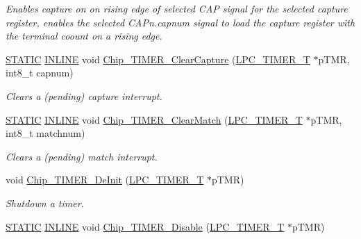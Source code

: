 \begin{DoxyCompactItemize}
\begin{DoxyCompactList}\small\item\em Enables capture on on rising edge of selected C\+AP signal for the selected capture register, enables the selected C\+A\+Pn.\+capnum signal to load the capture register with the terminal coount on a rising edge. \end{DoxyCompactList}\item 
\hyperlink{group__LPC__Types__Public__Macros_ga10b2d890d871e1489bb02b7e70d9bdfb}{S\+T\+A\+T\+IC} \hyperlink{group__LPC__Types__Public__Types_ga2eb6f9e0395b47b8d5e3eeae4fe0c116}{I\+N\+L\+I\+NE} void \hyperlink{group__TIMER__17XX__40XX_ga0aebc9314c86b4e9a67e2d08bab38e24}{Chip\+\_\+\+T\+I\+M\+E\+R\+\_\+\+Clear\+Capture} (\hyperlink{structLPC__TIMER__T}{L\+P\+C\+\_\+\+T\+I\+M\+E\+R\+\_\+T} $\ast$p\+T\+MR, int8\+\_\+t capnum)
\begin{DoxyCompactList}\small\item\em Clears a (pending) capture interrupt. \end{DoxyCompactList}\item 
\hyperlink{group__LPC__Types__Public__Macros_ga10b2d890d871e1489bb02b7e70d9bdfb}{S\+T\+A\+T\+IC} \hyperlink{group__LPC__Types__Public__Types_ga2eb6f9e0395b47b8d5e3eeae4fe0c116}{I\+N\+L\+I\+NE} void \hyperlink{group__TIMER__17XX__40XX_gae9ad45169f0511d27696923acfd6a17e}{Chip\+\_\+\+T\+I\+M\+E\+R\+\_\+\+Clear\+Match} (\hyperlink{structLPC__TIMER__T}{L\+P\+C\+\_\+\+T\+I\+M\+E\+R\+\_\+T} $\ast$p\+T\+MR, int8\+\_\+t matchnum)
\begin{DoxyCompactList}\small\item\em Clears a (pending) match interrupt. \end{DoxyCompactList}\item 
void \hyperlink{group__TIMER__17XX__40XX_gaa52f3e33303d7d4f1e2325586a21a5c0}{Chip\+\_\+\+T\+I\+M\+E\+R\+\_\+\+De\+Init} (\hyperlink{structLPC__TIMER__T}{L\+P\+C\+\_\+\+T\+I\+M\+E\+R\+\_\+T} $\ast$p\+T\+MR)
\begin{DoxyCompactList}\small\item\em Shutdown a timer. \end{DoxyCompactList}\item 
\hyperlink{group__LPC__Types__Public__Macros_ga10b2d890d871e1489bb02b7e70d9bdfb}{S\+T\+A\+T\+IC} \hyperlink{group__LPC__Types__Public__Types_ga2eb6f9e0395b47b8d5e3eeae4fe0c116}{I\+N\+L\+I\+NE} void \hyperlink{group__TIMER__17XX__40XX_gae7fedfd4c2543991eddd7be1b32bd00b}{Chip\+\_\+\+T\+I\+M\+E\+R\+\_\+\+Disable} (\hyperlink{structLPC__TIMER__T}{L\+P\+C\+\_\+\+T\+I\+M\+E\+R\+\_\+T} $\ast$p\+T\+MR)

\end{DoxyCompactItemize}
